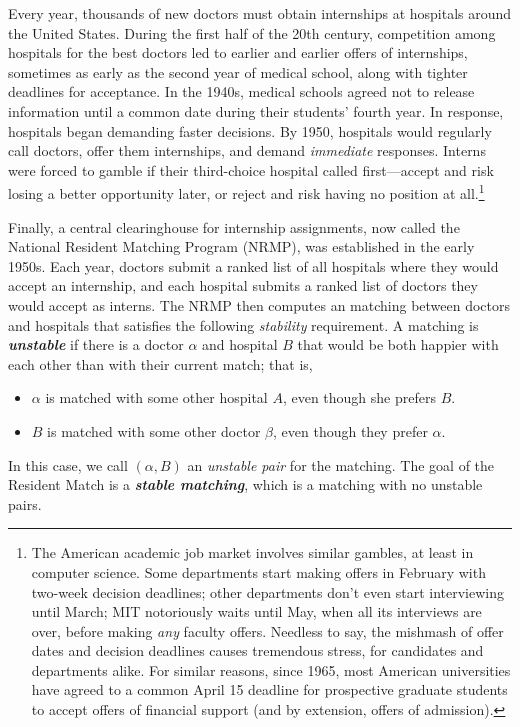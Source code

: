 Every year, thousands of new doctors must obtain internships at hospitals around the United States.
During the first half of the 20th century, competition among hospitals for the best doctors led to earlier and earlier offers of internships, sometimes as early as the second year of medical school, along with tighter deadlines for acceptance.
In the 1940s, medical schools agreed not to release information until a common date during their students’ fourth year.
In response, hospitals began demanding faster decisions.
By 1950, hospitals would regularly call doctors, offer them internships, and demand \textit{immediate} responses.
Interns were forced to gamble if their third-choice hospital called first---accept and risk losing a better opportunity later, or reject and risk having no position at all.\footnote{The American academic job market involves similar gambles, at least in computer science. Some departments start making offers in February with two-week decision deadlines; other departments don’t even start interviewing until March; MIT notoriously waits until May, when all its interviews are over, before making \textit{any} faculty offers. Needless to say, the mishmash of offer dates and decision deadlines causes tremendous stress, for candidates and departments alike. For similar reasons, since 1965, most American universities have agreed to a common April 15 deadline for prospective graduate students to accept offers of financial support (and by extension, offers of admission).}

Finally, a central clearinghouse for internship assignments, now called the National Resident Matching Program (NRMP), was established in the early 1950s.
Each year, doctors submit a ranked list of all hospitals where they would accept an internship, and each hospital submits a ranked list of doctors they would accept as interns.
The NRMP then computes an matching between doctors and hospitals that satisfies the following \textit{stability} requirement.
A matching is \textbf{\textit{unstable}} if there is a doctor $\alpha$ and hospital $B$ that would be both happier with each other than with their current match; that is,
\begin{itemize}
\item $\alpha$ is matched with some other hospital $A$, even though she prefers $B$.
\item $B$ is matched with some other doctor $\beta$, even though they prefer $\alpha$.
\end{itemize}
In this case, we call $(\alpha, B)$ an \textit{unstable pair} for the matching.
The goal of the Resident Match is a \textbf{\textit{stable matching}}, which is a matching with no unstable pairs.

